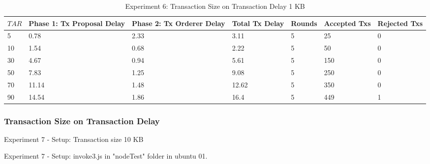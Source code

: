 \documentclass[10pt,journal,compsoc, twoside]{IEEEtran}
\begin{document}
\begin{table*}[htbp]
	\caption{Experiment 6: Transaction Size on Transaction Delay 1 KB}
	\begin{tabular}{|l|l|l|l|l|l|l|}
		\hline
		$TAR$ & Phase 1: Tx Proposal Delay & Phase 2: Tx Orderer Delay & Total Tx Delay & Rounds & Accepted Txs & Rejected Txs \\ \hline
		5     & 0.78                       & 2.33                      & 3.11           & 5      & 25           & 0            \\ \hline
		10    & 1.54                       & 0.68                      & 2.22           & 5      & 50           & 0            \\ \hline
		30    & 4.67                       & 0.94                      & 5.61           & 5      & 150          & 0            \\ \hline
		50    & 7.83                       & 1.25                      & 9.08           & 5      & 250          & 0            \\ \hline
		70    & 11.14                      & 1.48                      & 12.62          & 5      & 350          & 0            \\ \hline
		90    & 14.54                      & 1.86                      & 16.4           & 5      & 449          & 1            \\ \hline
	\end{tabular}
\end{table*}












\subsubsection{Transaction Size on Transaction Delay}

Experiment 7 - Setup: Transaction size 10 KB

Experiment 7 - Setup: invoke3.js in "nodeTest" folder in ubuntu 01.
\end{document}
